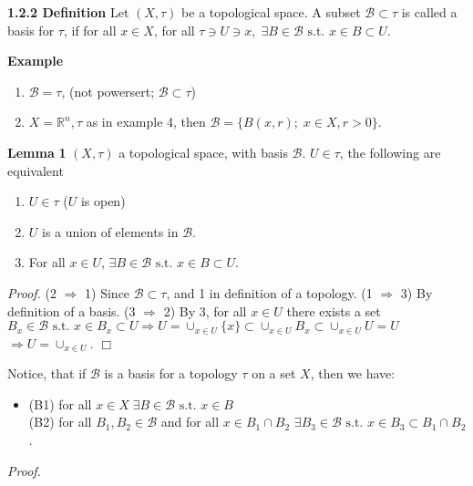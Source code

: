 \documentclass[12pt]{article}
\newcommand{\st}[0]{ \textrm{ s.t. } }
\newcommand{\rimply}[0] { \Rightarrow }
\newcommand{\reals}[0] { \mathbb{R}}
\newcommand{\B}[0] { \mathcal{B} }
\begin{document}
\begin{flushleft}
 { \bf 1.2.2 Definition }Let $(X, \tau)$ be a topological space. A subset $\B \subset \tau$ is called a basis for $\tau$, if for all $x \in X$, for all $\tau \ni U \ni x, \; \exists B \in \B \st x \in B \subset U$.\end{flushleft}\begin{flushleft} 
 { \bf Example }\begin{enumerate}[i]
\item
                $\B = \tau$, (not powersert; $\B \subset \tau$)
            \item
                $X = \reals^n, \tau$ as in example 4, then $\B = \{ B(x, r); \; x \in X, r>0 \}$.
            \end{enumerate}\end{flushleft}\begin{flushleft} 
 { \bf Lemma }{ \bf 1 }$(X, \tau)$ a topological space, with basis $\B$. $U \in \tau$, the following are equivalent\begin{enumerate}[i]
\item
                $U \in \tau$ ($U$ is open)
            \item
                $U$ is a union of elements in $\B$.
            \item
                For all $x \in U$, $\exists B \in \B \st x \in B \subset U$.
            \end{enumerate}\begin{flushleft} 
 \emph{Proof.  }(2 $\rimply$ 1) Since $\B \subset \tau$, and 1 in definition of a topology.
            (1 $\rimply$ 3) By definition of a basis.
            (3 $\rimply$ 2) By 3, for all $x \in U$  there exists a set $B_x \in \B \st x \in B_x \subset U \rimply U = \cup_{x \in U} \{x\} \subset \cup_{x \in U} B_x \subset \cup_{x \in U} U = U $ $\rimply U = \cup_{x \in U}$. $ \Box$\end{flushleft}\end{flushleft}Notice, that if $\B$ is a basis for a topology $\tau$ on a set $X$, then we have:\begin{itemize}
\item[] 
            (B1) for all $x \in X \; \exists B \in \B \st x \in B$ \\
            (B2) for all $B_1, B_2 \in \B$ and for all $x \in B_1 \cap B_2$ $\exists B_3 \in \B \st x \in B_3 \subset B_1 \cap B_2$.
        \end{itemize}\begin{flushleft} 
 \emph{Proof.  }\begin{itemize}

\end{itemize}
\end{flushleft}
\end{document}
